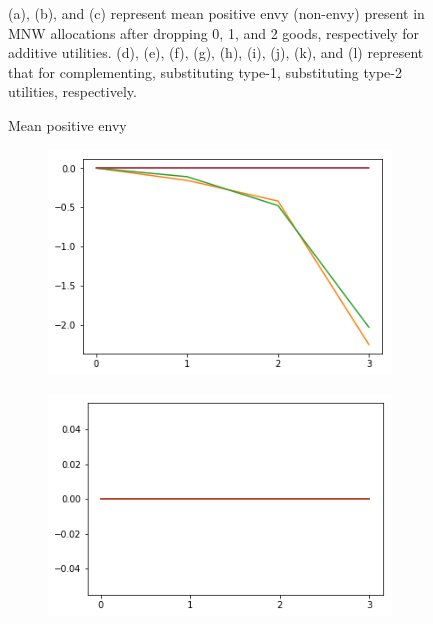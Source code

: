 \begin{figure}[h!]
\begin{subfigure}[b]{0.3\linewidth}
    \caption{}
  \end{subfigure}
  \caption{Mean positive envy}
  \label{fig:efk}
  \small
    (a), (b), and (c) represent mean positive envy (non-envy) present in MNW allocations after dropping 0, 1, and 2 goods, respectively for additive utilities. (d), (e), (f), (g), (h), (i), (j), (k), and (l) represent that for complementing, substituting type-1, substituting type-2 utilities, respectively.
\end{figure}

\begin{figure}[h!]
  \centering
  \begin{subfigure}[b]{0.3\linewidth}
    \includegraphics[width=\linewidth]{images/add/ef0_means_neg.png}
    \caption{}
  \end{subfigure}
  \begin{subfigure}[b]{0.3\linewidth}
    \includegraphics[width=\linewidth]{images/add/ef1_means_neg.png}

\end{subfigure}
\end{figure}
